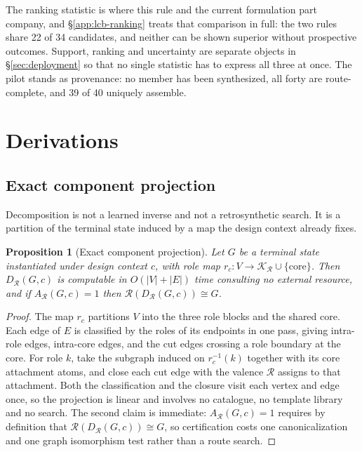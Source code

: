 \documentclass{article}
\newtheorem{proposition}{Proposition}
\newcommand{\LibraryZeroN}{40}
\newcommand{\LibraryZeroUnique}{39}
\newcommand{\RankShared}{22}                  %
\newcommand{\decomp}{\ensuremath{D_{\mathcal{R}}}}
\begin{document}
The ranking statistic is where this rule and the current formulation part company, and
\S\ref{app:lcb-ranking} treats that comparison in full: the two rules share \RankShared{} of 34
candidates, and neither can be shown superior without prospective outcomes. Support, ranking and
uncertainty are separate objects in \S\ref{sec:deployment} so that no single statistic has to express
all three at once. The pilot stands as provenance: no member has been synthesized, all forty are
route-complete, and \LibraryZeroUnique{} of \LibraryZeroN{} uniquely assemble.

\section{Derivations}
\label{app:derivations}


\subsection{Exact component projection}
\label{app:decomp-prop}
Decomposition is not a learned inverse and not a retrosynthetic search. It is a partition of the
terminal state induced by a map the design context already fixes.

\begin{proposition}[Exact component projection]
\label{prop:decomp}
Let $G$ be a terminal state instantiated under design context $c$, with role map
$r_c : V \rightarrow \mathcal{K}_{\mathcal{R}} \cup \{\mathrm{core}\}$. Then $\decomp(G,c)$ is
computable in $O(|V| + |E|)$ time consulting no external resource, and if $A_{\mathcal{R}}(G,c) = 1$
then $\mathcal{R}(\decomp(G,c)) \cong G$.
\end{proposition}

\begin{proof}
The map $r_c$ partitions $V$ into the three role blocks and the shared core. Each edge of $E$ is
classified by the roles of its endpoints in one pass, giving intra-role edges, intra-core edges, and
the cut edges crossing a role boundary at the core. For role $k$, take the subgraph induced on
$r_c^{-1}(k)$ together with its core attachment atoms, and close each cut edge with the valence
$\mathcal{R}$ assigns to that attachment. Both the classification and the closure visit each vertex
and edge once, so the projection is linear and involves no catalogue, no template library and no
search. The second claim is immediate: $A_{\mathcal{R}}(G,c) = 1$ requires by definition that
$\mathcal{R}(\decomp(G,c)) \cong G$, so certification costs one canonicalization and one graph
isomorphism test rather than a route search.
\end{proof}
\end{document}

